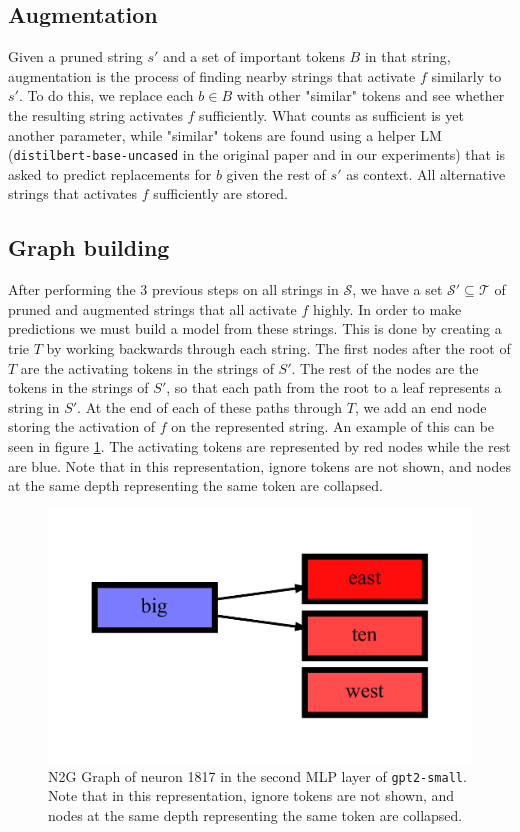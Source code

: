 \subsection{Augmentation}
\label{sec:n2g_augmentation}
Given a pruned string $s'$ and a set of important tokens $B$ in that string, 
augmentation is the process of finding nearby strings 
that activate $f$ similarly to $s'$.
To do this, we replace each $b\in B$ with other "similar" tokens and 
see whether the resulting string activates $f$ sufficiently.
What counts as sufficient is yet another parameter, 
while "similar" tokens are found using a helper \ac{LM} 
(\texttt{distilbert-base-uncased} in the original paper and in our experiments) 
that is asked to predict replacements for $b$ 
given the rest of $s'$ as context.
All alternative strings that activates $f$ sufficiently are stored.

\subsection{Graph building}
\label{sec:graph_building}
After performing the 3 previous steps on all strings in $\mathcal S$, 
we have a set $\mathcal S'\subseteq\mathcal T$ 
of pruned and augmented strings that all activate $f$ highly.
In order to make predictions we must build a model from these strings.
This is done by creating a trie $T$ 
by working backwards through each string.
The first nodes after the root of $T$ are the activating tokens 
in the strings of $S'$.
The rest of the nodes are the tokens in the strings of $S'$, 
so that each path from the root to a leaf represents a string in $S'$.
At the end of each of these paths through $T$, 
we add an end node storing the activation of $f$ on the represented string.
An example of this can be seen in figure \ref{fig:n2g_graph_gpt2-small_2_1817}.
The activating tokens are represented by red nodes while the rest are blue.
Note that in this representation, ignore tokens are not shown, and nodes at the same depth representing the same token are collapsed.

\begin{figure}[ht]
    \centering
    \includegraphics[width=\textwidth]{images/gpt2-small_2_1817.pdf}
    \caption{N2G Graph of neuron 1817 in the second \ac{MLP} layer of \texttt{gpt2-small}. 
    Note that in this representation, ignore tokens are not shown, and nodes at the same depth representing the same token are collapsed.}
    \label{fig:n2g_graph_gpt2-small_2_1817}
\end{figure}

